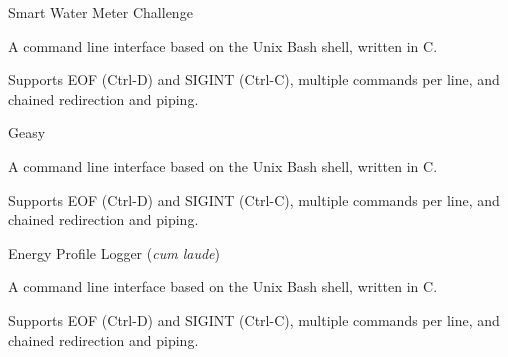\begin{cventries}
  \cventry
    {} %
    {Smart Water Meter Challenge} %
    {} %
    {} %
    {
      \begin{cvitems} %
        \item {A command line interface based on the Unix Bash shell, written in C.}
		\item {Supports EOF (Ctrl-D) and SIGINT (Ctrl-C), multiple commands per line, and chained redirection and piping.}
      \end{cvitems}
    }

  \cventry
    {} %
    {Geasy} %
    {} %
    {} %
    {
      \begin{cvitems} %
        \item {A command line interface based on the Unix Bash shell, written in C.}
		\item {Supports EOF (Ctrl-D) and SIGINT (Ctrl-C), multiple commands per line, and chained redirection and piping.}
      \end{cvitems}
    }

  \cventry
    {} %
    {Energy Profile Logger (\textit{cum laude})} %
    {} %
    {} %
    {
      \begin{cvitems} %
        \item {A command line interface based on the Unix Bash shell, written in C.}
		\item {Supports EOF (Ctrl-D) and SIGINT (Ctrl-C), multiple commands per line, and chained redirection and piping.}
      \end{cvitems}
    }

\end{cventries}